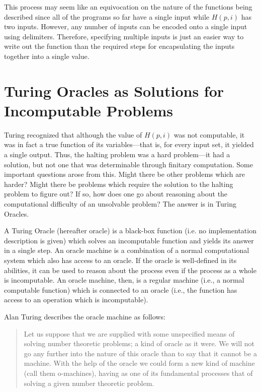 This process may seem like an equivocation on the nature of the functions being described
since all of the programs so far have a single input while $H(p, i)$ has two inputs.  However, any number of inputs can be encoded onto a single input using delimiters.  Therefore, specifying multiple inputs is just an easier way to write out the function than the required steps for encapsulating the inputs together into a single value.

\section[Turing Oracles as Solutions]{Turing Oracles as Solutions for Incomputable Problems}

Turing recognized that although the value of $H(p, i)$ was not computable, it was in fact a true function of its variables---that is, for every input set, it yielded a single output.  Thus, the halting problem was a hard problem---it had a solution, but not one that was determinable through finitary computation.  Some important questions arose from this.  Might there be other problems which are harder?  Might there be problems which require the solution to the halting problem to figure out?  If so, how does one go about reasoning about the computational difficulty of an unsolvable problem?  The answer is in Turing Oracles.

A Turing Oracle (hereafter oracle) is a black-box function (i.e. no implementation description is given) which solves an incomputable function and yields its answer in a single step.  An oracle machine is a combination of a normal computational system which also has access to an oracle.  If the oracle is well-defined in its abilities, it can be used to reason about the process even if the process as a whole is incomputable.  An oracle machine, then, is a regular machine (i.e., a normal computable function) which is connected to an oracle (i.e., the function has access to an operation which is incomputable).

Alan Turing describes the oracle machine as follows:

\begin{quote}
Let us suppose that we are supplied with some unspecified means of solving number theoretic problems; a kind of oracle as it were.  We will not go any further into the nature of this oracle than to say that it cannot be a machine.  With the help of the oracle we could form a new kind of machine (call them o-machines), having as one of its fundamental processes that of solving a given number theoretic problem. \citep[][\S{}4]{turing1939}
\end{quote}


